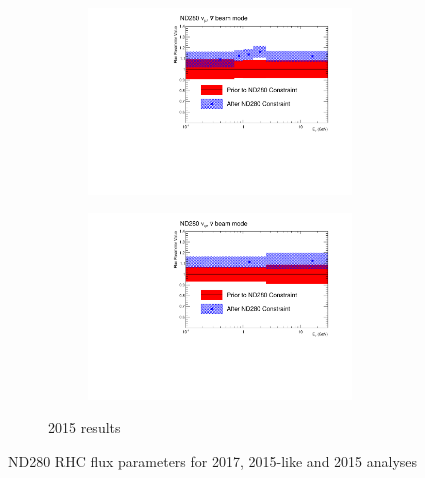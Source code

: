 \begin{figure}[h]
\begin{subfigure}[t]{\textwidth}
\begin{subfigure}[t]{0.24\textwidth}
			\includegraphics[width=\textwidth, trim={0mm 0mm 20mm 0mm}, clip]{figures/official/nd_nf_numu_flux_parms_bias_01}
		\end{subfigure}
		\begin{subfigure}[t]{0.24\textwidth}
			\includegraphics[width=\textwidth, trim={0mm 0mm 20mm 0mm}, clip]{figures/official/nd_nf_nue_flux_parms_bias_01}
		\end{subfigure}
		\caption{2015 results}
	\end{subfigure}
	\caption{ND280 RHC flux parameters for 2017, 2015-like and 2015 analyses}
	\label{fig:2015_fluxND280comp_rhc}
\end{figure}

